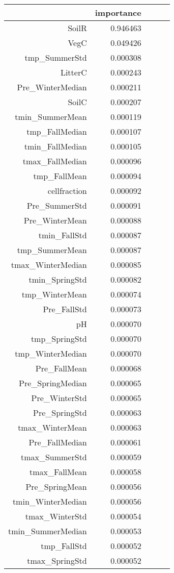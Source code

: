 \begin{tabular}{rrrrr}
\toprule
 & importance \\
\midrule
SoilR & 0.946463 \\
VegC & 0.049426 \\
tmp_SummerStd & 0.000308 \\
LitterC & 0.000243 \\
Pre_WinterMedian & 0.000211 \\
SoilC & 0.000207 \\
tmin_SummerMean & 0.000119 \\
tmp_FallMedian & 0.000107 \\
tmin_FallMedian & 0.000105 \\
tmax_FallMedian & 0.000096 \\
tmp_FallMean & 0.000094 \\
cellfraction & 0.000092 \\
Pre_SummerStd & 0.000091 \\
Pre_WinterMean & 0.000088 \\
tmin_FallStd & 0.000087 \\
tmp_SummerMean & 0.000087 \\
tmax_WinterMedian & 0.000085 \\
tmin_SpringStd & 0.000082 \\
tmp_WinterMean & 0.000074 \\
Pre_FallStd & 0.000073 \\
pH & 0.000070 \\
tmp_SpringStd & 0.000070 \\
tmp_WinterMedian & 0.000070 \\
Pre_FallMean & 0.000068 \\
Pre_SpringMedian & 0.000065 \\
Pre_WinterStd & 0.000065 \\
Pre_SpringStd & 0.000063 \\
tmax_WinterMean & 0.000063 \\
Pre_FallMedian & 0.000061 \\
tmax_SummerStd & 0.000059 \\
tmax_FallMean & 0.000058 \\
Pre_SpringMean & 0.000056 \\
tmin_WinterMedian & 0.000056 \\
tmax_WinterStd & 0.000054 \\
tmin_SummerMedian & 0.000053 \\
tmp_FallStd & 0.000052 \\
tmax_SpringStd & 0.000052 \\

\end{tabular}
